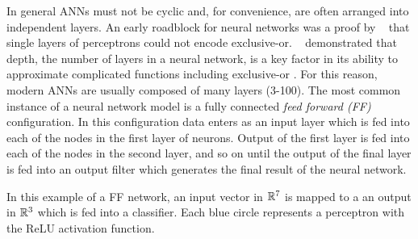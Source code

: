 In general ANNs 
must not be cyclic and, for convenience, are often arranged into
independent layers. An early roadblock for neural networks was a proof
by ~\citet{minsky1969perceptrons} that single layers of perceptrons
could not encode exclusive-or. ~\citet{kak1993training} demonstrated
that depth, the number of layers in a neural network, is a key factor in its ability to approximate complicated functions including exclusive-or . For this reason, modern ANNs are usually composed of many layers (3-100). The most common instance of a neural network model is a fully connected \emph{feed forward (FF)} configuration. In this configuration data enters as an input layer which is fed into each of the nodes in the first layer of neurons. Output of the first layer is fed into each of the nodes in the second layer, and so on until the output of the final layer is fed into an output filter which generates the final result of the neural network. 




In this example of a FF network, an input vector in $\mathbb{R}^7$ is mapped to a
an output in $\mathbb{R}^3$ which is fed into a classifier. Each blue circle
represents a perceptron with the ReLU activation function. 


